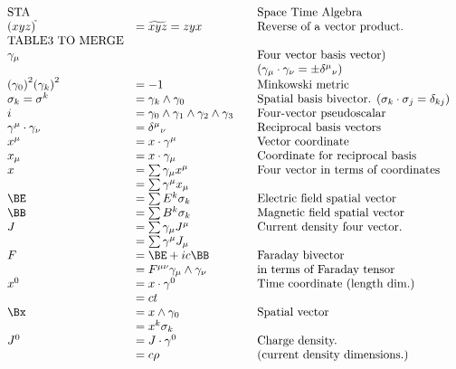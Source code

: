 \begin{equation*}
\begin{array}{l l l}
\text{STA} & & \quad \mbox{Space Time Algebra} \\
(xyz)^{\tilde{}} &= \widetilde{xyz} = z y x & \quad \mbox{Reverse of a vector product.} \\
\mbox{TABLE3 TO MERGE} \\
\gamma_{\mu} & & \quad \mbox{Four vector basis vector)} \\
& & \quad \mbox{($\gamma_{\mu} \cdot \gamma_{\nu} = \pm {\delta^{\mu}}_{\nu}$)} \\
{(\gamma_0)}^2 {(\gamma_k)}^2 &= -1 & \quad \mbox{Minkowski metric} \\
\sigma_k = \sigma^k &= \gamma_{k} \wedge \gamma_0 & \quad \mbox{Spatial basis bivector. ($\sigma_k \cdot \sigma_j = \delta_{kj}$)} \\
i &= \gamma_{0} \wedge \gamma_1 \wedge \gamma_{2} \wedge \gamma_3 & \quad \mbox{Four-vector pseudoscalar} \\
\gamma^{\mu} \cdot \gamma_{\nu} &= {\delta^{\mu}}_{\nu} & \quad \mbox{Reciprocal basis vectors} \\
x^{\mu} &= x \cdot \gamma^{\mu} & \quad \mbox{Vector coordinate} \\
x_{\mu} &= x \cdot \gamma_{\mu} & \quad \mbox{Coordinate for reciprocal basis} \\
x &= \sum \gamma_{\mu} x^{\mu} & \quad \mbox{Four vector in terms of coordinates} \\
  &= \sum \gamma^{\mu} x_{\mu} \\
\BE &= \sum E^k \sigma_k & \quad \mbox{Electric field spatial vector} \\
\BB &= \sum B^k \sigma_k & \quad \mbox{Magnetic field spatial vector} \\
J &= \sum \gamma_{\mu} J^{\mu} & \quad \mbox{Current density four vector.} \\
  &= \sum \gamma^{\mu} J_{\mu} \\
F &= \BE + i c \BB & \quad \mbox{Faraday bivector} \\
  &= F^{\mu\nu} \gamma_\mu \wedge \gamma_\nu & \quad \mbox{in terms of Faraday tensor} \\
x^{0} &= x \cdot \gamma^0 & \quad \mbox{Time coordinate (length dim.)} \\
      &= c t \\
\Bx &= x \wedge \gamma_0 & \quad \mbox{Spatial vector} \\
    &= x^k \sigma_k \\
J^{0} &= J \cdot \gamma^0 & \quad \mbox{Charge density.} \\
      &= c \rho & \quad \mbox{(current density dimensions.)} \\

\end{array}
\end{equation*}
